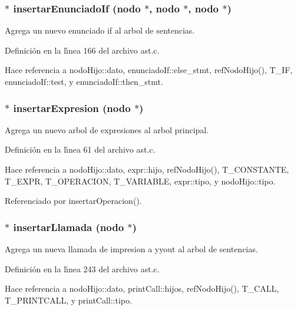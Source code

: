 \subsubsection{$\ast$ insertar\-Enunciado\-If ({\bf nodo} $\ast$, {\bf nodo} $\ast$, {\bf nodo} $\ast$)}\label{ast_8h_a25}


Agrega un nuevo enunciado if al arbol de sentencias. 



Definici\'{o}n en la l\'{\i}nea 166 del archivo ast.c.

Hace referencia a nodo\-Hijo::dato, enunciado\-If::else\_\-stmt, ref\-Nodo\-Hijo(), T\_\-IF, enunciado\-If::test, y enunciado\-If::then\_\-stmt.
\subsubsection{$\ast$ insertar\-Expresion ({\bf nodo} $\ast$)}\label{ast_8h_a21}


Agrega un nuevo arbol de expresiones al arbol principal. 



Definici\'{o}n en la l\'{\i}nea 61 del archivo ast.c.

Hace referencia a nodo\-Hijo::dato, expr::hijo, ref\-Nodo\-Hijo(), T\_\-CONSTANTE, T\_\-EXPR, T\_\-OPERACION, T\_\-VARIABLE, expr::tipo, y nodo\-Hijo::tipo.

Referenciado por insertar\-Operacion().
\subsubsection{$\ast$ insertar\-Llamada ({\bf nodo} $\ast$)}\label{ast_8h_a29}


Agrega un nueva llamada de impresion a yyout al arbol de sentencias. 



Definici\'{o}n en la l\'{\i}nea 243 del archivo ast.c.

Hace referencia a nodo\-Hijo::dato, print\-Call::hijos, ref\-Nodo\-Hijo(), T\_\-CALL, T\_\-PRINTCALL, y print\-Call::tipo.
